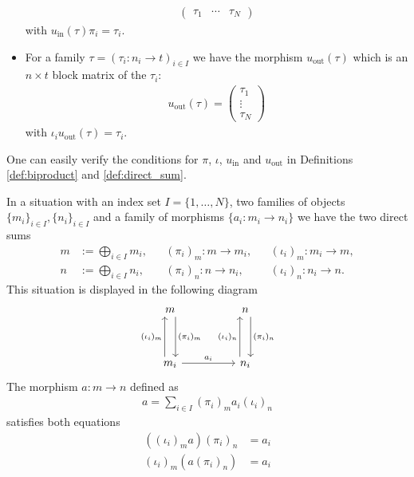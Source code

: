 \begin{example}
\begin{itemize}
\begin{align}
\begin{pmatrix}
\tau_{1} & \cdots & \tau_{N}
\end{pmatrix}
\end{align}
with $u_{\text{in}}(\tau) \pi_{i} = \tau_{i}$.
\item For a family $\tau = (\tau_{i} : n_{i} \rightarrow t)_{i \in I}$ we have the morphism $u_{\text{out}}(\tau)$ which is an $n \times t$ block matrix
of the $\tau_{i}$:
\begin{align}
u_{\text{out}}(\tau) = \label{eq:u_out_direct_sum_matrix}
\begin{pmatrix}
\tau_{1} \\
\vdots \\
\tau_{N}
\end{pmatrix}
\end{align}
with $\iota_{i} u_{\text{out}}(\tau) = \tau_{i}$.
\end{itemize}
One can easily verify the conditions for $\pi$, $\iota$, $u_{\text{in}}$ and $u_{\text{out}}$ in Definitions \ref{def:biproduct} and \ref{def:direct_sum}.
\end{example}

\begin{example}
In a situation with an index set $I = \{1,\dots,N\}$, two families of objects $\{m_{i}\}_{i\in I}, \{n_{i}\}_{i\in I}$ and a family of
morphisms $\{a_{i} : m_{i} \rightarrow n_{i}\}$ we have the two direct sums
\begin{align}
m &:= \bigoplus_{i\in I} m_{i}, &&(\pi_{i})_{m} : m \rightarrow m_{i}, &&(\iota_{i})_{m} : m_{i} \rightarrow m, \\
n &:= \bigoplus_{i\in I} n_{i}, &&(\pi_{i})_{n} : n \rightarrow n_{i}, &&(\iota_{i})_{n} : n_{i} \rightarrow n.
\end{align}
This situation is displayed in the following diagram
\[
\begin{tikzcd}
m \arrow[dd, "(\pi_{i})_{m}", shift left=2]                           &  & n \arrow[dd, "(\pi_{i})_{n}", shift left=2]       \\
                                                                      &  &                                                   \\
m_{i} \arrow[uu, "(\iota_{i})_{m}", shift left=2] \arrow[rr, "a_{i}"] &  & n_{i} \arrow[uu, "(\iota_{i})_{n}", shift left=2]
\end{tikzcd}
\]
The morphism $a : m \rightarrow n$ defined as
\begin{align}
a = \sum_{i \in I} (\pi_{i})_{m} a_{i} (\iota_{i})_{n}
\end{align}
satisfies both equations
\begin{align}
((\iota_{i})_{m} a )(\pi_{i})_{n} &= a_{i} \\
(\iota_{i})_{m} (a (\pi_{i})_{n}) &= a_{i}
\end{align}
\end{example}


